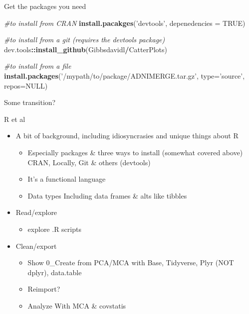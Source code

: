 \documentclass[
  ignorenonframetext,
]{beamer}
\newenvironment{Shaded}{\begin{snugshade}}{\end{snugshade}}
\newcommand{\CommentTok}[1]{\textcolor[rgb]{0.56,0.35,0.01}{\textit{#1}}}
\newcommand{\DataTypeTok}[1]{\textcolor[rgb]{0.13,0.29,0.53}{#1}}
\newcommand{\KeywordTok}[1]{\textcolor[rgb]{0.13,0.29,0.53}{\textbf{#1}}}
\newcommand{\NormalTok}[1]{#1}
\newcommand{\OperatorTok}[1]{\textcolor[rgb]{0.81,0.36,0.00}{\textbf{#1}}}
\newcommand{\OtherTok}[1]{\textcolor[rgb]{0.56,0.35,0.01}{#1}}
\newcommand{\StringTok}[1]{\textcolor[rgb]{0.31,0.60,0.02}{#1}}
\providecommand{\tightlist}{%
  \setlength{\itemsep}{0pt}\setlength{\parskip}{0pt}}
\begin{document}
\begin{frame}[fragile]{Get the packages you need}
\protect\hypertarget{get-the-packages-you-need}{}

\begin{Shaded}
\begin{Highlighting}[]
\CommentTok{#to install from CRAN}
\KeywordTok{install.pacakges}\NormalTok{(}\StringTok{'devtools'}\NormalTok{, }\DataTypeTok{depenedencies =} \OtherTok{TRUE}\NormalTok{)}

\CommentTok{#to install from a git  (requires the devtools package)}
\NormalTok{dev.tools}\OperatorTok{::}\KeywordTok{install_github}\NormalTok{(Gibbsdavidl}\OperatorTok{/}\NormalTok{CatterPlots)}

\CommentTok{#to install from a file}
\KeywordTok{install.packages}\NormalTok{(}\StringTok{'/mypath/to/package/ADNIMERGE.tar.gz'}\NormalTok{, }
                 \DataTypeTok{type=}\StringTok{'source'}\NormalTok{, }\DataTypeTok{repos=}\OtherTok{NULL}\NormalTok{) }
\end{Highlighting}
\end{Shaded}

\end{frame}

\begin{frame}{Some transition?}
\protect\hypertarget{some-transition}{}

\end{frame}

\begin{frame}{R et al}
\protect\hypertarget{r-et-al}{}

\begin{itemize}
\tightlist
\item
  A bit of background, including idiosyncrasies and unique things about
  R

  \begin{itemize}
  \tightlist
  \item
    Especially packages \& three ways to install (somewhat covered
    above) CRAN, Locally, Git \& others (devtools)
  \item
    It's a functional language
  \item
    Data types Including data frames \& alts like tibbles
  \end{itemize}
\item
  Read/explore

  \begin{itemize}
  \tightlist
  \item
    explore .R scripts
  \end{itemize}
\item
  Clean/export

  \begin{itemize}
  \tightlist
  \item
    Show 0\_Create from PCA/MCA with Base, Tidyverse, Plyr (NOT dplyr),
    data.table
  \item
    Reimport?
  \item
    Analyze With MCA \& covstatis
  \end{itemize}
\end{itemize}

\end{frame}
\end{document}
